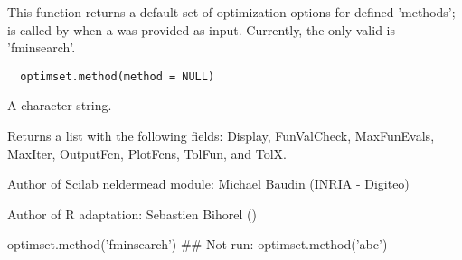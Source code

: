 %
\begin{Description}\relax
This function returns a default set of optimization options for defined
'methods';  is called by  when a
 was provided as input. Currently, the only valid 
is 'fminsearch'.
\end{Description}
%
\begin{Usage}
\begin{verbatim}
  optimset.method(method = NULL)
\end{verbatim}
\end{Usage}
%
\begin{Arguments}
\begin{ldescription}
\item[\code{method}] A character string.
\end{ldescription}
\end{Arguments}
%
\begin{Value}
Returns a list with the following fields: Display, FunValCheck, MaxFunEvals,
MaxIter, OutputFcn, PlotFcns, TolFun, and TolX.
\end{Value}
%
\begin{Author}\relax
Author of Scilab neldermead module: Michael Baudin (INRIA - Digiteo)

Author of R adaptation: Sebastien Bihorel ()
\end{Author}
%
\begin{SeeAlso}\relax
{}
\end{SeeAlso}
%
\begin{Examples}
\begin{ExampleCode}
  optimset.method('fminsearch')
  ## Not run: optimset.method('abc')
\end{ExampleCode}
\end{Examples}
